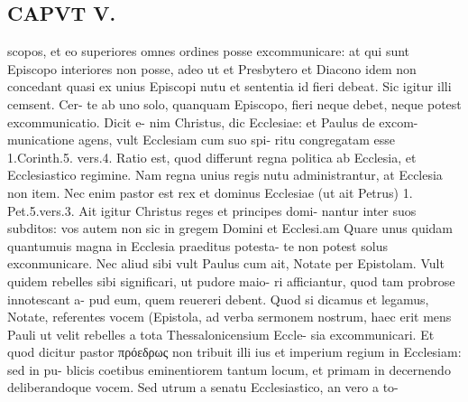 \documentclass{article}
\begin{document}
\begin{pages}
\section*{CAPVT V. }
\marginpar{[ p.393 ]}scopos, et eo superiores omnes ordines posse excommunicare: at qui sunt Episcopo interiores non posse, adeo ut et Presbytero et Diacono idem non concedant quasi ex unius Episcopi nutu et sententia id fieri debeat. Sic igitur illi cemsent. Cer- te ab uno solo, quanquam Episcopo, fieri neque debet, neque potest excommunicatio. Dicit e- nim Christus, dic Ecclesiae: et Paulus de excom- municatione agens, vult Ecclesiam cum suo spi- ritu congregatam esse 1.Corinth.5. vers.4. Ratio est, quod differunt regna politica ab Ecclesia, et Ecclesiastico regimine. Nam regna unius regis nutu administrantur, at Ecclesia non item. Nec enim pastor est rex et dominus Ecclesiae (ut ait Petrus) 1. Pet.5.vers.3. Ait igitur Christus reges et principes domi- nantur inter suos subditos: vos autem non sic in gregem Domini et Ecclesi.am Quare unus quidam quantumuis magna in Ecclesia praeditus potesta- te non potest solus exconmunicare. Nec aliud sibi vult Paulus cum ait, Notate per Epistolam. Vult quidem rebelles sibi significari, ut pudore maio- ri afficiantur, quod tam probrose innotescant a- pud eum, quem reuereri debent. Quod si dicamus et legamus, Notate, referentes vocem (Epistola, ad verba sermonem nostrum, haec erit mens Pauli ut velit rebelles a tota Thessalonicensium Eccle- sia excommunicari. Et quod dicitur pastor πρόεδρως non tribuit illi ius et imperium regium in Ecclesiam: sed in pu- blicis coetibus eminentiorem tantum locum, et primam in decernendo deliberandoque vocem. Sed utrum a senatu Ecclesiastico, an vero a to- 

\end{pages}
\end{document}
